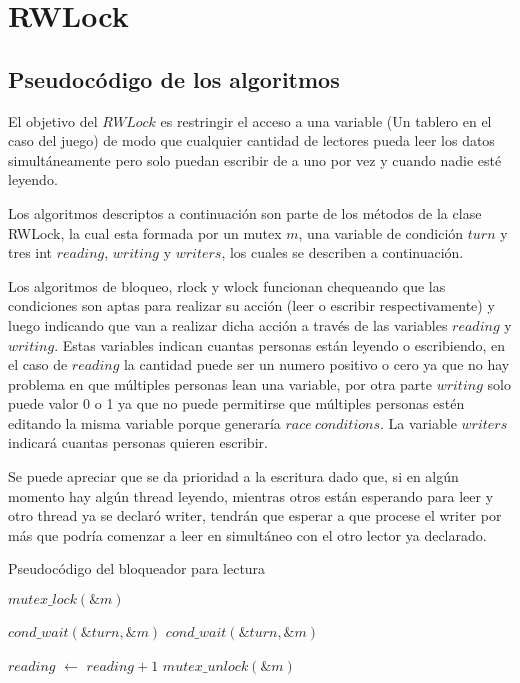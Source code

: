 \section{RWLock}

\subsection{Pseudocódigo de los algoritmos}

El objetivo del $RWLock$ es restringir el acceso a una variable (Un tablero en el caso del juego) de modo que cualquier cantidad de lectores pueda leer los datos simultáneamente pero solo puedan escribir de a uno por vez y cuando nadie esté leyendo.

Los algoritmos descriptos a continuación son parte de los métodos de la clase RWLock, la cual esta formada por un mutex $m$, una variable de condición $turn$ y tres int $reading$, $writing$ y $writers$, los cuales se describen a continuación.

Los algoritmos de bloqueo, rlock y wlock funcionan chequeando que las condiciones son aptas para realizar su acción (leer o escribir respectivamente) y luego indicando que van a realizar dicha acción a través de las variables $reading$ y $writing$. Estas variables indican cuantas personas están leyendo o escribiendo, en el caso de $reading$ la cantidad puede ser un numero positivo o cero ya que no hay problema en que múltiples personas lean una variable, por otra parte $writing$ solo puede valor 0 o 1 ya que no puede permitirse que múltiples personas estén editando la misma variable porque generaría $race\ conditions$. La variable $writers$ indicará cuantas personas quieren escribir.

Se puede apreciar que se da prioridad a la escritura dado que, si en algún momento hay algún thread leyendo, mientras otros están esperando para leer y otro thread ya se declaró writer, tendrán que esperar a que procese el writer por más que podría comenzar a leer en simultáneo con el otro lector ya declarado.

\begin{algorithm}[H]
  \begin{algorithmic}[1]
  \caption{Pseudocódigo del bloqueador para lectura}
  \label{algo:3-1}
	\State $mutex\_lock(\&m)$

		\State $ cond\_wait(\&turn, \&m) $
	\EndWhile
		\State $ cond\_wait(\&turn, \&m) $
	\EndWhile
	
	\State $reading$ $\leftarrow$ $reading + 1$
	\State $mutex\_unlock(\&m)$

	\EndProcedure
	\end{algorithmic}
\end{algorithm}


